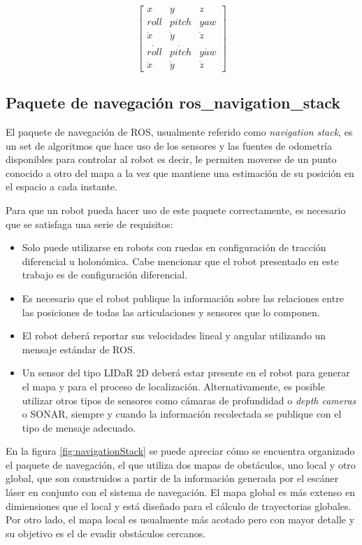 \[
    \begin{bmatrix}
        x          & y           & z         \\
        roll       & pitch       & yaw       \\
        \dot{x}    & \dot{y}     & \dot{z}   \\
        \dot{roll} & \dot{pitch} & \dot{yaw} \\
        \ddot{x}   & \ddot{y}    & \ddot{z}
    \end{bmatrix}
\]


\subsection{Paquete de navegación ros\_navigation\_stack}\label{sec:rosNavigation}

El paquete de navegación de ROS, usualmente referido como \textit{navigation stack}, es un set de algoritmos que hace uso de los sensores y las fuentes de odometría disponibles para controlar al robot es decir, le permiten moverse de un punto conocido a otro del mapa a la vez que mantiene una estimación de su posición en el espacio a cada instante.

Para que un robot pueda hacer uso de este paquete correctamente, es necesario que se satisfaga una serie de requisitos:
\begin{itemize}
    \item Solo puede utilizarse en robots con ruedas en configuración de tracción diferencial u holonómica. Cabe mencionar que el robot presentado en este trabajo es de configuración diferencial.
    \item Es necesario que el robot publique la información sobre las relaciones entre las posiciones de todas las articulaciones y sensores que lo componen.
    \item El robot deberá reportar sus velocidades lineal y angular utilizando un mensaje estándar de ROS.
    \item Un sensor del tipo LIDaR 2D deberá estar presente en el robot para generar el mapa y para el proceso de localización. Alternativamente, es posible utilizar otros tipos de sensores como cámaras de profundidad o \textit{depth cameras} o SONAR, siempre y cuando la información recolectada se publique con el tipo de mensaje adecuado.
\end{itemize}

En la figura \ref{fig:navigationStack} se puede apreciar cómo se encuentra organizado el paquete de navegación, el que utiliza dos mapas de obstáculos, uno local y otro global, que son construidos a partir de la información generada por el escáner láser en conjunto con el sistema de navegación. El mapa global es más extenso en dimiensiones que el local y está diseñado para el cálculo de trayectorias globales. Por otro lado, el mapa local es usualmente más acotado pero con mayor detalle y su objetivo es el de evadir obstáculos cercanos.

